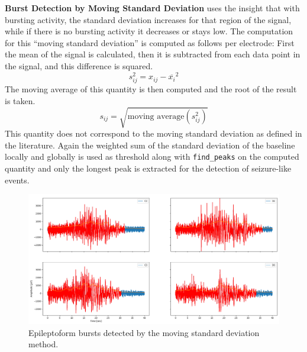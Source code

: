 \documentclass[11pt, twocolumn]{article}
\begin{document}
    \textbf{Burst Detection by Moving Standard Deviation} uses the insight that with bursting activity, the standard deviation increases for that region of the signal, while if there is no bursting activity it decreases or stays low.
    The computation for this ``moving standard deviation'' is computed as follows per electrode:
    First the mean of the signal is calculated, then it is subtracted from each data point in the signal, and this difference is squared.
    \[ s^2_{ij} = {x_{ij} - \overline{x_i}}^2 \]
    The moving average of this quantity is then computed and the root of the result is taken.
    \[ s_{ij} = \sqrt{\text{moving average}(s^2_{ij})} \]
    This quantity does not correspond to the moving standard deviation as defined in the literature.
    Again the weighted sum of the standard deviation of the baseline locally and globally is used as threshold along with \texttt{find\_peaks} on the computed quantity and only the longest peak is extracted for the detection of seizure-like events.
    	\begin{figure}
     \begin{center}
      \includegraphics[keepaspectratio, width=\linewidth]{img/4_bursts_std.png}
     \end{center}
		\caption{Epileptoform bursts detected by the moving standard deviation method.}
    \end{figure}
\end{document}
